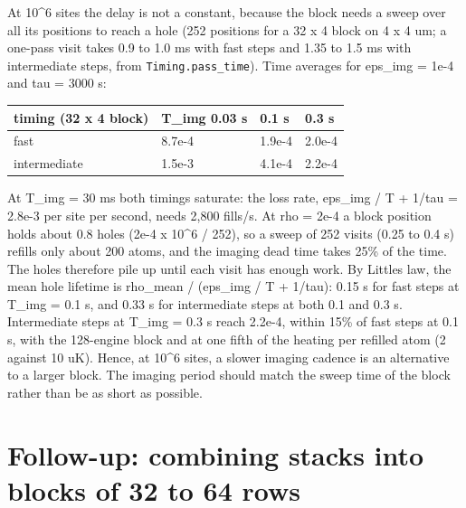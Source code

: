 At 10\^{}6 sites the delay is not a constant, because the block needs a
sweep over all its positions to reach a hole (252 positions for a 32 x 4
block on 4 x 4 um; a one-pass visit takes 0.9 to 1.0 ms with fast steps
and 1.35 to 1.5 ms with intermediate steps, from
\texttt{Timing.pass\_time}). Time averages for eps\_img = 1e-4 and tau =
3000 s:

{\small
\begin{longtable}[]{@{}llll@{}}
\toprule\noalign{}
timing (32 x 4 block) & T\_img 0.03 s & 0.1 s & 0.3 s \\
\midrule\noalign{}
\endhead
\bottomrule\noalign{}
\endlastfoot
fast & 8.7e-4 & 1.9e-4 & 2.0e-4 \\
intermediate & 1.5e-3 & 4.1e-4 & 2.2e-4 \\
\end{longtable}
}

At T\_img = 30 ms both timings saturate: the loss rate, eps\_img / T +
1/tau = 2.8e-3 per site per second, needs 2,800 fills/s. At rho = 2e-4 a
block position holds about 0.8 holes (2e-4 x 10\^{}6 / 252), so a sweep
of 252 visits (0.25 to 0.4 s) refills only about 200 atoms, and the
imaging dead time takes 25\% of the time. The holes therefore pile up
until each visit has enough work. By Little\textquotesingle s law, the
mean hole lifetime is rho\_mean / (eps\_img / T + 1/tau): 0.15 s for
fast steps at T\_img = 0.1 s, and 0.33 s for intermediate steps at both
0.1 and 0.3 s. Intermediate steps at T\_img = 0.3 s reach 2.2e-4, within
15\% of fast steps at 0.1 s, with the 128-engine block and at one fifth
of the heating per refilled atom (2 against 10 uK). Hence, at 10\^{}6
sites, a slower imaging cadence is an alternative to a larger block. The
imaging period should match the sweep time of the block rather than be
as short as possible.

\hypertarget{11-follow-up-combining-stacks-into-blocks-of-32-to-64-rows}{%
\section{Follow-up: combining stacks into blocks of 32 to 64
rows}\label{megascale-11-follow-up-combining-stacks-into-blocks-of-32-to-64-rows}}

